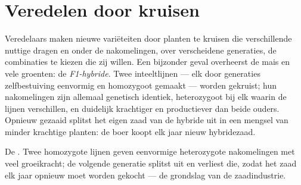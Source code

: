 \section{Veredelen door kruisen}

\begin{proposition}\label{prop:g12:domesticated-plants:hybrids}
Veredelaars maken nieuwe variëteiten door planten te kruisen die
verschillende nuttige  dragen en onder de nakomelingen, over
verscheidene generaties, de combinaties te kiezen die zij willen. Een
bijzonder geval overheerst de mais en vele groenten: de
\emph{F1-hybride}. Twee inteeltlijnen --- elk door
generaties zelfbestuiving eenvormig en homozygoot gemaakt --- worden
gekruist; hun nakomelingen zijn allemaal genetisch identiek, heterozygoot
bij elk  waarin de lijnen verschillen, en duidelijk krachtiger en
productiever dan beide ouders. Opnieuw gezaaid splitst het eigen zaad van
de hybride uit in een mengsel van minder krachtige planten: de boer koopt
elk jaar nieuw hybridezaad.
\end{proposition}
\admitted

\begin{omfigure}

{\small De . Twee homozygote lijnen geven eenvormige
heterozygote nakomelingen met veel groeikracht; de volgende generatie
splitst uit en verliest die, zodat het zaad elk jaar opnieuw moet worden
gekocht --- de grondslag van de zaadindustrie.}
\end{omfigure}

